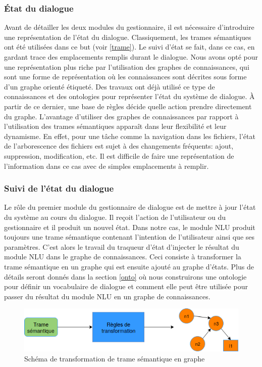 \subsubsection{État du dialogue}
Avant de détailler les deux modules du gestionnaire, il est nécessaire d'introduire une représentation de l'état du dialogue. Classiquement, les trames sémantiques ont été utilisées dans ce but (voir \ref{trame}). Le suivi d'état se fait, dans ce cas, en gardant trace des emplacements remplis durant le dialogue.
Nous avons opté pour une représentation plus riche par l'utilisation des graphes de connaissances, qui sont une forme de représentation où les connaissances sont décrites sous forme d'un graphe orienté étiqueté. Des travaux ont déjà utilisé ce type de connaissances \citep{Stoyanchev2018} et des ontologies \citep{Wessel2019} pour représenter l'état du système de dialogue. À partir de ce dernier, une base de règles décide quelle action prendre directement du graphe. L'avantage d'utiliser des graphes de connaissances par rapport à l'utilisation des trames sémantiques apparaît dans leur flexibilité et leur dynamisme. En effet, pour une tâche comme la navigation dans les fichiers, l'état de l'arborescence des fichiers est sujet à des changements fréquents: ajout, suppression, modification, etc. Il est difficile de faire une représentation de l'information dans ce cas avec de simples emplacements à remplir.
\subsubsection{Suivi de l'état du dialogue}
Le rôle du premier module du gestionnaire de dialogue est de mettre à jour l'état du système au cours du dialogue. Il reçoit l'action de l'utilisateur ou du gestionnaire et il produit un nouvel état. Dans notre cas, le module NLU produit toujours une trame sémantique contenant l'intention de l'utilisateur ainsi que ses paramètres. C'est alors le travail du traqueur d'état d'injecter le résultat du module NLU dans le graphe de connaissances. Ceci consiste à transformer la trame sémantique en un graphe qui est ensuite ajouté au graphe d'états. Plus de détails seront donnés dans la section \ref{onto} où nous construirons une ontologie pour définir un vocabulaire de dialogue et comment elle peut être utilisée pour passer du résultat du module NLU en un graphe de connaissances.
\begin{figure}[H] 
	
	\centering
	\includegraphics[width=0.8\linewidth]{images/Conception/DM/Transformer.png}
	\caption{Schéma de transformation de trame sémantique en graphe}
\end{figure}\label{transformer}
